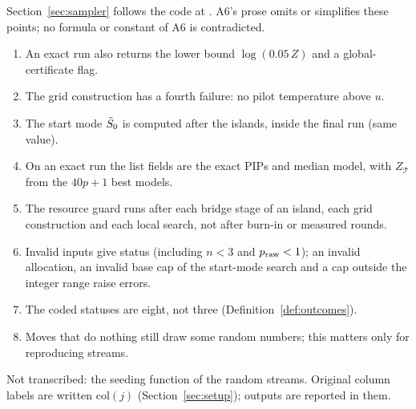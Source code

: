 Section~\ref{sec:sampler} follows the code at . A6's prose omits or simplifies these points;
no formula or constant of A6 is contradicted.
\begin{enumerate}[label=\textbf{S\arabic*.},leftmargin=2.6em,itemsep=1pt]
  \item An exact run also returns the lower bound $\log(0.05\,Z)$ and a global-certificate flag.
  \item The grid construction has a fourth failure: no pilot temperature above $u$.
  \item The start mode $\tilde S_0$ is computed after the islands, inside the final run (same value).
  \item On an exact run the list fields are the exact PIPs and median model, with $Z_{\mathcal T}$ from the $40p+1$ best
    models.
  \item The resource guard runs after each bridge stage of an island, each grid construction and each local search, not
    after burn-in or measured rounds.
  \item Invalid inputs give status  (including $n<3$ and $p_{\mathrm{raw}}<1$); an invalid allocation, an invalid
    base cap of the start-mode search and a cap outside the integer range raise errors.
  \item The coded statuses are eight, not three (Definition~\ref{def:outcomes}).
  \item Moves that do nothing still draw some random numbers; this matters only for reproducing streams.
\end{enumerate}
Not transcribed: the seeding function of the random streams. Original column labels are written $\mathrm{col}(j)$
(Section~\ref{sec:setup}); outputs are reported in them.
